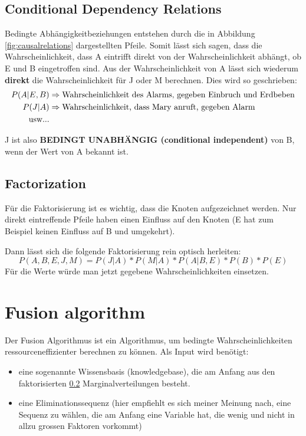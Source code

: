 \subsection{Conditional Dependency Relations}

Bedingte Abhängigkeitbeziehungen entstehen durch die in Abbildung \ref{fig:causalrelations} dargestellten Pfeile. Somit lässt sich sagen, dass die Wahrscheinlichkeit, dass A eintrifft direkt von der Wahrscheinlichkeit abhängt, ob E und B eingetroffen sind. Aus der Wahrscheinlichkeit von A lässt sich wiederum \textbf{direkt} die Wahrscheinlichkeit für J oder M berechnen. Dies wird so geschrieben:
\begin{align}
\begin{split}
P(A | E,B) &\Rightarrow \textnormal{Wahrscheinlichkeit des Alarms, gegeben Einbruch und Erdbeben}\\
P(J | A) &\Rightarrow \textnormal{Wahrscheinlichkeit, dass Mary anruft, gegeben Alarm}\\
\textnormal{usw...}
\end{split}
\end{align}

J ist also \textbf{BEDINGT UNABHÄNGIG (conditional independent)} von B, wenn der Wert von A bekannt ist.

\subsection{Factorization}
\label{sec:factorization}

Für die Faktorisierung ist es wichtig, dass die Knoten aufgezeichnet werden. Nur direkt eintreffende Pfeile haben einen Einfluss auf den Knoten (E hat zum Beispiel keinen Einfluss auf B und umgekehrt).

Dann lässt sich die folgende Faktorisierung rein optisch herleiten:
\[
P(A,B,E,J,M) = P(J | A) * P(M | A) * P(A | B, E) * P(B) * P(E)
\]
Für die Werte würde man jetzt gegebene Wahrscheinlichkeiten einsetzen.

\section{Fusion algorithm}
Der Fusion Algorithmus ist ein Algorithmus, um bedingte Wahrscheinlichkeiten ressourceneffizienter berechnen zu können. Als Input wird benötigt: 
\begin{itemize}
\item eine sogenannte Wissensbasis (knowledgebase), die am Anfang aus den faktorisierten \ref{sec:factorization} Marginalverteilungen besteht.
\item eine Eliminationssequenz (hier empfiehlt es sich meiner Meinung nach, eine Sequenz zu wählen, die am Anfang eine Variable hat, die wenig und nicht in allzu grossen Faktoren vorkommt)
\end{itemize}

